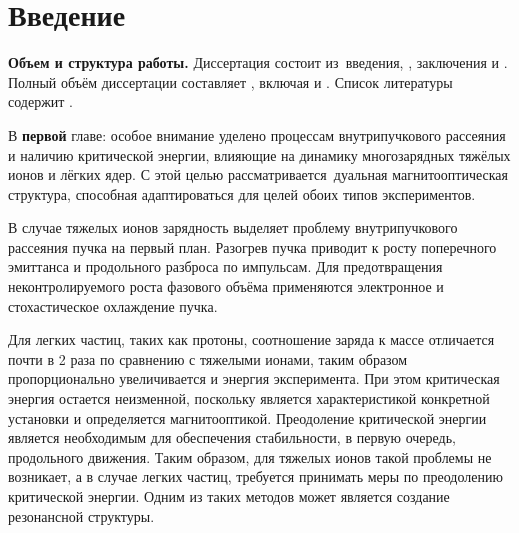 \chapter*{Введение}                         %

\newcommand{\progress}{}
\newcommand{\aim}{{\textbf\aimTXT}}
\newcommand{\tasks}{\textbf{\tasksTXT}}
\newcommand{\novelty}{\textbf{\noveltyTXT}}
\newcommand{\influence}{\textbf{\influenceTXT}}
\newcommand{\methods}{\textbf{\methodsTXT}}
\newcommand{\defpositions}{\textbf{\defpositionsTXT}}
\newcommand{\reliability}{\textbf{\reliabilityTXT}}
\newcommand{\probation}{\textbf{\probationTXT}}
\newcommand{\contribution}{\textbf{\contributionTXT}}
\newcommand{\publications}{\textbf{\publicationsTXT}}


\textbf{Объем и структура работы.} Диссертация состоит из~введения,
,
заключения и
.
%
Полный объём диссертации составляет
, включая
 и
.
Список литературы содержит
.

В \textbf{первой} главе: особое внимание уделено процессам внутрипучкового рассеяния и наличию критической энергии, влияющие на динамику многозарядных тяжёлых ионов и лёгких ядер. С этой целью рассматривается дуальная магнитооптическая структура, способная адаптироваться для целей обоих типов экспериментов.
\par В случае тяжелых ионов зарядность выделяет проблему внутрипучкового рассеяния пучка на первый план. Разогрев пучка приводит к росту поперечного эмиттанса и продольного разброса по импульсам. Для предотвращения неконтролируемого роста фазового объёма применяются электронное и стохастическое охлаждение пучка.
\par Для легких частиц, таких как протоны, соотношение заряда к массе отличается почти в 2 раза по сравнению с тяжелыми ионами, таким образом пропорционально увеличивается и энергия эксперимента. При этом критическая энергия остается неизменной, поскольку является характеристикой конкретной установки и определяется магнитооптикой. Преодоление критической энергии является необходимым для обеспечения стабильности, в первую очередь, продольного движения. Таким образом, для тяжелых ионов такой проблемы не возникает, а в случае легких частиц, требуется принимать меры по преодолению критической энергии. Одним из таких методов может является создание резонансной структуры. 

